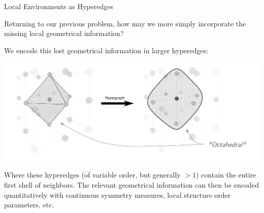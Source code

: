 \documentclass[11pt]{beamer}
\begin{document}
\begin{frame}{Local Environments as Hyperedges}
\small

Returning to our previous problem, how may we more simply  incorporate the missing local geometrical information?

\medskip\pause

We encode this lost geometrical information in larger hyperedges:

\medskip

\hspace{1cm}\includegraphics[scale=0.27]{motif_level_ex.pdf}

\medskip\pause

Where these hyperedges (of variable order, but generally $>1$) contain the entire first shell of neighbors. \pause 
The relevant geometrical information can then be encoded quantitatively with continuous symmetry measures, local structure order parameters, etc.
\end{frame}


\end{document}
